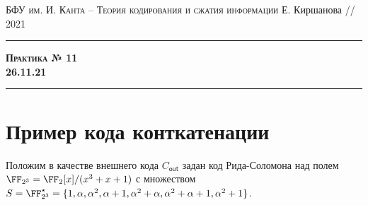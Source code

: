 \documentclass[11pt]{exam}
\theoremstyle{definition}
\begin{document}
	{\noindent
		\textsc{БФУ им. И. Канта -- Теория кодирования и сжатия информации}
		\hfill {Е. Киршанова // 2021\\}
	\hrule
	\begin{center}
		{\Large\textbf{
				\textsc{Практика № 11} \\[5pt] {26.11.21}
		} } 
	\end{center}
	\hrule \vspace{5mm}
	
	\thispagestyle{empty}
	
	\vspace{0.2cm}
	

	
%
		
	
%			
% 		
 		
 
\section{Пример кода конткатенации}

\begin{questions}
	
	\question Положим в качестве внешнего кода $C_{\mathsf{out}}$ задан код Рида-Соломона над полем $\FF_{2^3} = \FF_2[x]/(x^3+x+1)$ с множеством $S =\FF_{2^3}^\star  = \{ 1, \alpha, \alpha^2, \alpha+1, \alpha^2+\alpha, \alpha^2+\alpha+1, \alpha^2+1  \}$.
	

\end{questions}}
\end{document}
